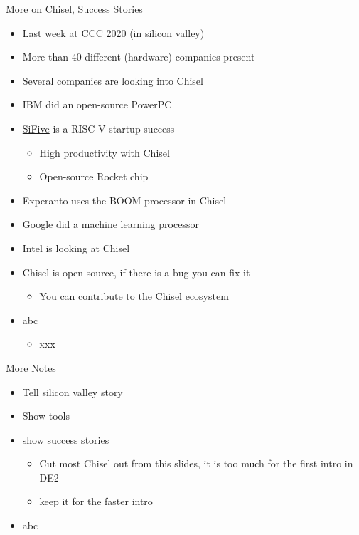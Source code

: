 \documentclass[xcolor=pdflatex,dvipsnames,table]{beamer}
\begin{document}
\begin{frame}[fragile]{More on Chisel, Success Stories}
\begin{itemize}
\item Last week at CCC 2020 (in silicon valley)
\item More than 40 different (hardware) companies present
\item Several companies are looking into Chisel
\item IBM did an open-source PowerPC
\item \href{https://www.sifive.com/}{SiFive} is a RISC-V startup success
\begin{itemize}
\item High productivity with Chisel
\item Open-source Rocket chip
\end{itemize}
\item Experanto uses the BOOM processor in Chisel
\item Google did a machine learning processor
\item Intel is looking at Chisel
\item Chisel is open-source, if there is a bug you can fix it
\begin{itemize}
\item You can contribute to the Chisel ecosystem
\end{itemize}
\item abc
\begin{itemize}
\item xxx
\end{itemize}
\end{itemize}
\end{frame}

\begin{frame}[fragile]{More Notes}
\begin{itemize}
\item Tell silicon valley story
\item Show tools
\item show success stories
\begin{itemize}
\item Cut most Chisel out from this slides, it is too much for the first intro in DE2
\item keep it for the faster intro
\end{itemize}
\item abc
\end{itemize}
\end{frame}
\end{document}
